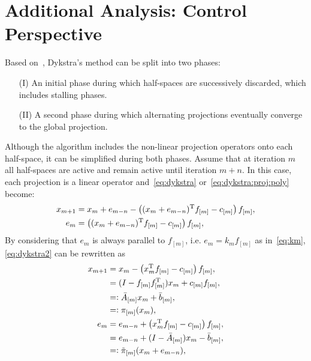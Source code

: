 \documentclass[hidelinks]{article}
\begin{document}
\section{Additional Analysis: Control Perspective}

Based on~\cite{DYKSTRAPERKINS}, Dykstra's method can be split into two phases:
\begin{enumerate}
\item[(I)] An initial phase during which half-spaces are successively discarded, which includes stalling phases.
\item[(II)] A second phase during which alternating projections eventually converge to the global projection.
\end{enumerate}

Although the algorithm includes the non-linear projection operators onto each half-space, it can be simplified during both phases. Assume that at iteration $m$ all half-spaces are active and remain active until iteration $m+n$. In this case, each projection is a linear operator and~\eqref{eq:dykstra} or~\eqref{eq:dykstra:proj:poly} become:
\begin{subequations}\label{eq:dykstra20}
\begin{align}
x_{m+1}&=x_{m}+e_{m-n} - \left((x_{m}+e_{m-n})^{\text{T}} f_{[m]} - c_{[m]}\right) f_{[m]},\label{eq:dykstra:proj20}\\
e_m&=\left((x_{m}+e_{m-n})^{\text{T}} f_{[m]} - c_{[m]}\right) f_{[m]}\label{eq:dykstra:error20},
\end{align}
\end{subequations}
By considering that $e_m$ is always parallel to $f_{[m]}$, i.e. $e_m=k_mf_{[m]}$ as in~\eqref{eq:km}, \eqref{eq:dykstra2} can be rewritten as
\begin{subequations}\label{eq:dykstra2}
\begin{align}
x_{m+1}&=x_{m} - \left(x_{m}^{\text{T}} f_{[m]} - c_{[m]}\right) f_{[m]},\notag\\
&=(I-f_{[m]}f_{[m]}^{\text{T}})x_{m}+c_{[m]} f_{[m]},\notag\\
&=\vcentcolon\bar{A}_{[m]}x_{m}+\bar{b}_{[m]},\notag\\
&=\vcentcolon \pi_{[m]}(x_{m}),\label{eq:dykstra:proj2}\\
e_m&=e_{m-n}+\left(x_{m}^{\text{T}} f_{[m]} - c_{[m]}\right) f_{[m]},\notag\\
&=e_{m-n}+(I-\bar{A}_{[m]})x_{m}-\bar{b}_{[m]},\notag\\
&=\vcentcolon \tilde{\pi}_{[m]}(x_{m}+e_{m-n}),\label{eq:dykstra:error2}
\end{align}
\end{subequations}
\end{document}
